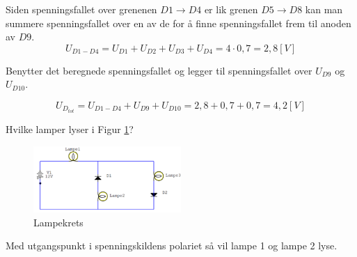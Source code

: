 \vspace{0.5cm} %

\begin{solution}[name=Løsningsforslag oppgave]
Siden spenningsfallet over grenenen $D1 \rightarrow D4$ er lik grenen $D5 \rightarrow D8$ kan man summere spenningsfallet over en av de for å finne spenningsfallet frem til anoden av $D9$.
\[U_{D1-D4}=U_{D1}+U_{D2}+U_{D3}+U_{D4}= 4\cdot0,7=2,8[V]\]

Benytter det beregnede spenningsfallet og legger til spenningsfallet over $U_{D9}$ og $U_{D10}$.

\[U_{D_{tot}}=U_{D1-D4}+U_{D9}+U_{D10}=2,8+0,7+0,7=4,2 [V]\]

\end{solution}

\vspace{0.5cm} %



\begin{question}[name=Oppgave, topic=dioder]
	Hvilke lamper lyser i Figur \ref{fig:hvilkenLampe}?
	
	\begin{figure}[H]
		\centering
		\includegraphics[width=0.5\textwidth]{diode/figurer/hvalyser.png}
		\caption{Lampekrets}
		\label{fig:hvilkenLampe}
	\end{figure}
	
	
\end{question}

\vspace{0.5cm} %

\begin{solution}[name=Løsningsforslag oppgave]
Med utgangspunkt i spenningskildens polariet så vil lampe 1 og lampe 2 lyse.
	
\end{solution}

\vspace{0.5cm} %


